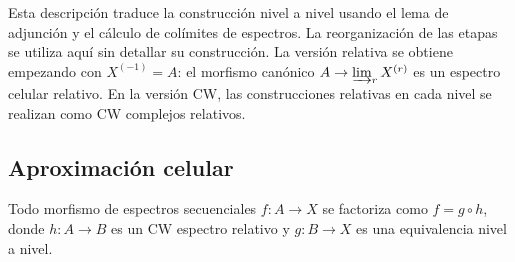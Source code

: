 Esta descripción traduce la construcción nivel a nivel usando el lema de adjunción y el cálculo de colímites de espectros. La reorganización de las etapas se utiliza aquí sin detallar su construcción. La versión relativa se obtiene empezando con $X^{(-1)}=A$: el morfismo canónico $A\to\varinjlim\nolimits_rX^{(r)}$ es un espectro celular relativo. En la versión CW, las construcciones relativas en cada nivel se realizan como CW complejos relativos.

\subsection{Aproximación celular}

\begin{prop}\label{prop:c11-factorizacion-celular}
Todo morfismo de espectros secuenciales $f\colon A\to X$ se factoriza como $f=g\circ h$, donde $h\colon A\to B$ es un CW espectro relativo y $g\colon B\to X$ es una equivalencia nivel a nivel.
\end{prop}
